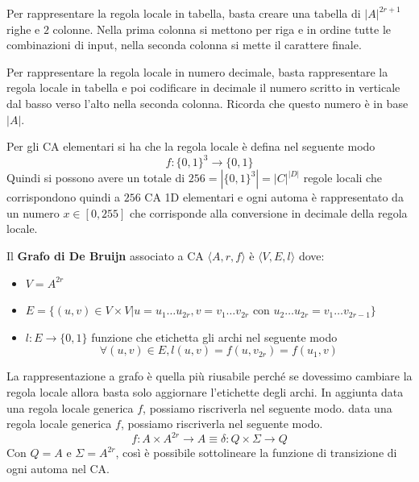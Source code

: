 \begin{esempio} 
    Per rappresentare la regola locale in tabella, basta creare una tabella di
    $|A|^{2r+1}$ righe e $2$ colonne. Nella prima colonna si mettono per riga e in ordine
    tutte le combinazioni di input, nella seconda colonna si mette il carattere
    finale.
\end{esempio}

\begin{esempio} 
    Per rappresentare la regola locale in numero decimale, basta rappresentare
    la regola locale in tabella e poi codificare in decimale il numero scritto in
    verticale dal basso verso l'alto nella seconda colonna. Ricorda che questo numero
    è in base $|A|$.
\end{esempio}

\begin{nota}
    Per gli CA elementari si ha che la regola locale è defina nel seguente modo
    $$f:\{0,1\}^3\rightarrow \{0,1\}$$
    Quindi si possono avere un totale di $256 = |\{0,1\}^3|
        = |C|^{|D|}$ regole locali che
    corrispondono quindi a $256$ CA 1D elementari e ogni automa è rappresentato da un
    numero $x\in [0, 255]$ che corrisponde alla conversione in decimale della regola
    locale.
\end{nota}

\begin{definizione} 
    Il \textbf{Grafo di De Bruijn} associato a CA $\langle A, r, f\rangle$ è $\langle V,E,l\rangle$
    dove:
    \begin{itemize}
        \item $V=A^{2r}$
        \item $E = \{(u,v)\in V\times V | u=u_1\dots u_{2r},  v=v_1\dots v_{2r} \text{ con } u_2\dots u_{2r} = v_1\dots v_{2r-1}\}$
        \item $l:E\rightarrow \{0,1\}$ funzione che etichetta gli archi nel seguente
              modo $$\forall (u,v)\in E, l(u,v) = f(u,v_{2r})=f(u_1,v)$$
    \end{itemize}
\end{definizione}

La rappresentazione a grafo è quella più riusabile perché se dovessimo cambiare
la regola locale allora basta solo aggiornare l'etichette degli archi. In aggiunta
data una regola locale generica $f$, possiamo riscriverla nel seguente modo.
data una regola locale generica $f$, possiamo riscriverla nel seguente modo.
\begin{equation}
    f: A\times A^{2r} \rightarrow A \equiv \delta: Q\times \Sigma \rightarrow Q
\end{equation}
Con $Q= A$ e $\Sigma = A^{2r} $, così è possibile sottolineare la funzione di transizione
di ogni automa nel CA.

